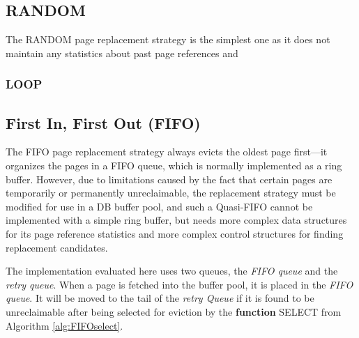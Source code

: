 \subsection{RANDOM} \label{subsec:random}

    The RANDOM page replacement strategy is the simplest one as it does not maintain any statistics about past page references and

\subsubsection{LOOP} \label{subsubsec:loop}

    

\subsection[FIFO]{First In, First Out (FIFO)} \label{subsec:fifo}

    The FIFO page replacement strategy always evicts the oldest page first---it organizes the pages in a FIFO queue, which is normally implemented as a ring buffer. However, due to limitations caused by the fact that certain pages are temporarily or permanently unreclaimable, the replacement strategy must be modified for use in a DB buffer pool, and such a Quasi-FIFO cannot be implemented with a simple ring buffer, but needs more complex data structures for its page reference statistics and more complex control structures for finding replacement candidates.

    The implementation evaluated here uses two queues, the \emph{FIFO queue} and the \emph{retry queue}. When a page is fetched into the buffer pool, it is placed in the \emph{FIFO queue}. It will be moved to the tail of the \emph{retry Queue} if it is found to be unreclaimable after being selected for eviction by the {\footnotesize \textbf{function} SELECT} from Algorithm \ref{alg:FIFOselect}.

